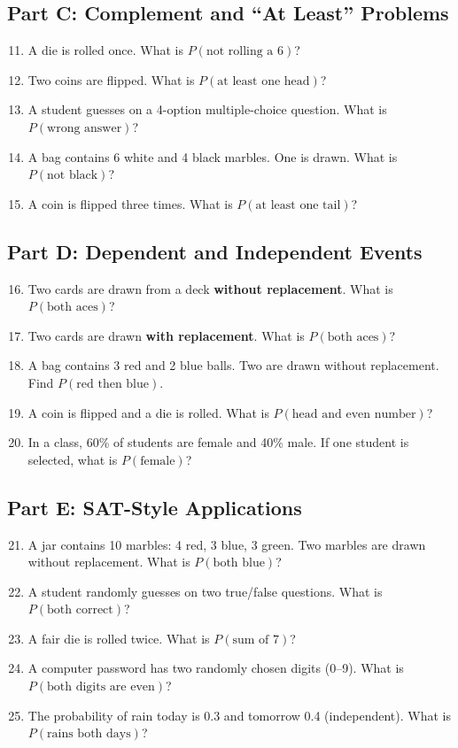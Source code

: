 \documentclass[12pt]{article}
\begin{document}
\subsection*{Part C: Complement and “At Least” Problems}
\begin{enumerate}
  \setcounter{enumi}{10}
  \item A die is rolled once. What is \(P(\text{not rolling a 6})\)?
  \item Two coins are flipped. What is \(P(\text{at least one head})\)?
  \item A student guesses on a 4-option multiple-choice question. What is \(P(\text{wrong answer})\)?
  \item A bag contains 6 white and 4 black marbles. One is drawn. What is \(P(\text{not black})\)?
  \item A coin is flipped three times. What is \(P(\text{at least one tail})\)?
\end{enumerate}

\subsection*{Part D: Dependent and Independent Events}
\begin{enumerate}
  \setcounter{enumi}{15}
  \item Two cards are drawn from a deck \textbf{without replacement}. What is \(P(\text{both aces})\)?
  \item Two cards are drawn \textbf{with replacement}. What is \(P(\text{both aces})\)?
  \item A bag contains 3 red and 2 blue balls. Two are drawn without replacement. Find \(P(\text{red then blue})\).
  \item A coin is flipped and a die is rolled. What is \(P(\text{head and even number})\)?
  \item In a class, 60\% of students are female and 40\% male. If one student is selected, what is \(P(\text{female})\)?
\end{enumerate}

\subsection*{Part E: SAT-Style Applications}
\begin{enumerate}
  \setcounter{enumi}{20}
  \item A jar contains 10 marbles: 4 red, 3 blue, 3 green. Two marbles are drawn without replacement. What is \(P(\text{both blue})\)?
  \item A student randomly guesses on two true/false questions. What is \(P(\text{both correct})\)?
  \item A fair die is rolled twice. What is \(P(\text{sum of 7})\)?
  \item A computer password has two randomly chosen digits (0–9). What is \(P(\text{both digits are even})\)?
  \item The probability of rain today is 0.3 and tomorrow 0.4 (independent). What is \(P(\text{rains both days})\)?
\end{enumerate}
\end{document}
